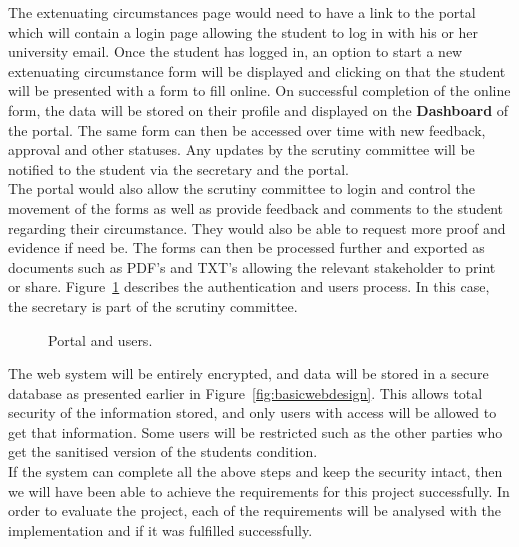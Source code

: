 \documentclass[../main.tex]{subfiles}
\begin{document}
\raggedright

The extenuating circumstances page\cite{ecfuni} would need to have a link to the portal which will contain a login page allowing the student to log in with his or her university email. Once the student has logged in, an option to start a new extenuating circumstance form will be displayed and clicking on that the student will be presented with a form to fill online. On successful completion of the online form, the data will be stored on their profile and displayed on the \textbf{Dashboard} of the portal. The same form can then be accessed over time with new feedback, approval and other statuses. Any updates by the scrutiny committee will be notified to the student via the secretary and the portal. \\[4mm]

The portal would also allow the scrutiny committee to login and control the movement of the forms as well as provide feedback and comments to the student regarding their circumstance. They would also be able to request more proof and evidence if need be. The forms can then be processed further and exported as documents such as PDF's and TXT's allowing the relevant stakeholder to print or share. Figure~\ref{fig:portal1} describes the authentication and users process. In this case, the secretary is part of the scrutiny committee. 

	\begin{figure}[H]
        \caption{\label{fig:portal1} Portal and users.}
      \end{figure}

The web system will be entirely encrypted, and data will be stored in a secure database as presented earlier in Figure~\ref{fig:basicwebdesign}. This allows total security of the information stored, and only users with access will be allowed to get that information. Some users will be restricted such as the other parties who get the sanitised version of the students condition. \\[4mm]

If the system can complete all the above steps and keep the security intact, then we will have been able to achieve the requirements for this project successfully. In order to evaluate the project, each of the requirements will be analysed with the implementation and if it was fulfilled successfully. 
\end{document}
